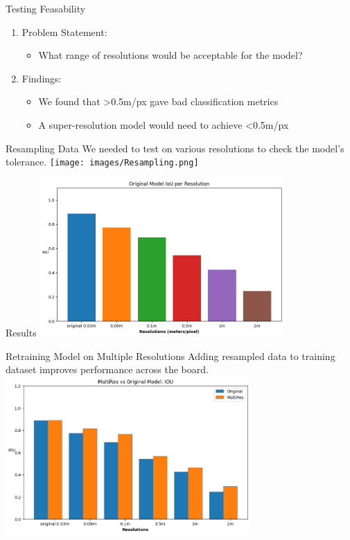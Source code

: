 \begin{frame}{Testing Feasability}
    \centering
    \begin{enumerate}
        \item Problem Statement:
            \begin{itemize}
                \item What range of resolutions would be acceptable for the model?
            \end{itemize}
        \item Findings:
            \begin{itemize}
                \item We found that >0.5m/px gave bad classification metrics
                \item A super-resolution model would need to achieve <0.5m/px
            \end{itemize}
    \end{enumerate}
\end{frame}

\begin{frame}{Resampling Data}
    \centering
    We needed to test on various resolutions to check the model's tolerance.
    \texttt{[image: images/Resampling.png]}
\end{frame}

\begin{frame}{Results}
    \centering
    \includegraphics[height=0.7\textheight,width=0.7\textwidth,keepaspectratio]{images/og_multires_iou.png}
\end{frame}

\begin{frame}{Retraining Model on Multiple Resolutions}
    Adding resampled data to training dataset improves performance across the board.
    \centering
    \includegraphics[height=0.7\textheight,width=0.7\textwidth,keepaspectratio]{images/og_vs_multires.png}
\end{frame}

